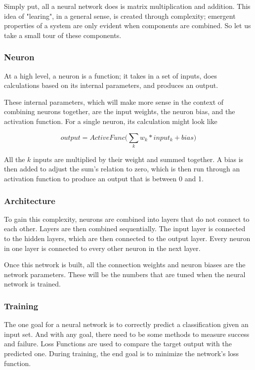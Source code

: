 \documentclass[%
 reprint,
 amsmath,amssymb,
 aps,
]{revtex4-2}
\begin{document}
Simply put, all a neural network does is matrix multiplication and addition. This idea of "learing", in a general sense, is created through complexity; emergent properties of a system are only evident when components are combined. So let us take a small tour of these components.

\subsubsection{Neuron}

At a high level, a neuron is a function; it takes in a set of inputs, does calculations based on its internal parameters, and produces an output.

These internal parameters, which will make more sense in the context of combining neurons together, are the input weights, the neuron bias, and the activation function. For a single neuron, its calculation might look like

\begin{equation*}
    output = ActiveFunc \bigg (\sum_k w_k*input_k + bias \bigg)
\end{equation*}

All the $k$ inputs are multiplied by their weight and summed together. A bias is then added to adjust the sum's relation to zero, which is then run through an activation function to produce an output that is between 0 and 1. 

\subsubsection{Architecture}

To gain this complexity, neurons are combined into layers that do not connect to each other. Layers are then combined sequentially. The input layer is connected to the hidden layers, which are then connected to the output layer. Every neuron in one layer is connected to every other neuron in the next layer.

Once this network is built, all the connection weights and neuron biases are the network parameters. These will be the numbers that are tuned when the neural network is trained.

\subsubsection{Training}

The one goal for a neural network is to correctly predict a classification given an input set. And with any goal, there need to be some methods to measure success and failure. Loss Functions are used to compare the target output with the predicted one. During training, the end goal is to minimize the network's loss function.
\end{document}
